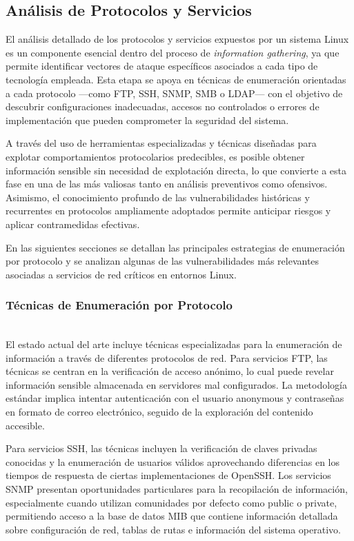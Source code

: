 \documentclass[runningheads]{llncs}
\begin{document}
\subsection{Análisis de Protocolos y Servicios}

El análisis detallado de los protocolos y servicios expuestos por un sistema Linux es un componente esencial dentro del proceso de \textit{information gathering}, ya que permite identificar vectores de ataque específicos asociados a cada tipo de tecnología empleada. Esta etapa se apoya en técnicas de enumeración orientadas a cada protocolo —como FTP, SSH, SNMP, SMB o LDAP— con el objetivo de descubrir configuraciones inadecuadas, accesos no controlados o errores de implementación que pueden comprometer la seguridad del sistema.

A través del uso de herramientas especializadas y técnicas diseñadas para explotar comportamientos protocolarios predecibles, es posible obtener información sensible sin necesidad de explotación directa, lo que convierte a esta fase en una de las más valiosas tanto en análisis preventivos como ofensivos. Asimismo, el conocimiento profundo de las vulnerabilidades históricas y recurrentes en protocolos ampliamente adoptados permite anticipar riesgos y aplicar contramedidas efectivas.

En las siguientes secciones se detallan las principales estrategias de enumeración por protocolo y se analizan algunas de las vulnerabilidades más relevantes asociadas a servicios de red críticos en entornos Linux.

\subsubsection{Técnicas de Enumeración por Protocolo}
\hfill\\

El estado actual del arte incluye técnicas especializadas para la enumeración de información a través de diferentes protocolos de red. Para servicios FTP, las técnicas se centran en la verificación de acceso anónimo, lo cual puede revelar información sensible almacenada en servidores mal configurados. La metodología estándar implica intentar autenticación con el usuario anonymous y contraseñas en formato de correo electrónico, seguido de la exploración del contenido accesible.

Para servicios SSH, las técnicas incluyen la verificación de claves privadas conocidas y la enumeración de usuarios válidos aprovechando diferencias en los tiempos de respuesta de ciertas implementaciones de OpenSSH. Los servicios SNMP presentan oportunidades particulares para la recopilación de información, especialmente cuando utilizan comunidades por defecto como public o private, permitiendo acceso a la base de datos MIB que contiene información detallada sobre configuración de red, tablas de rutas e información del sistema operativo.
\end{document}
